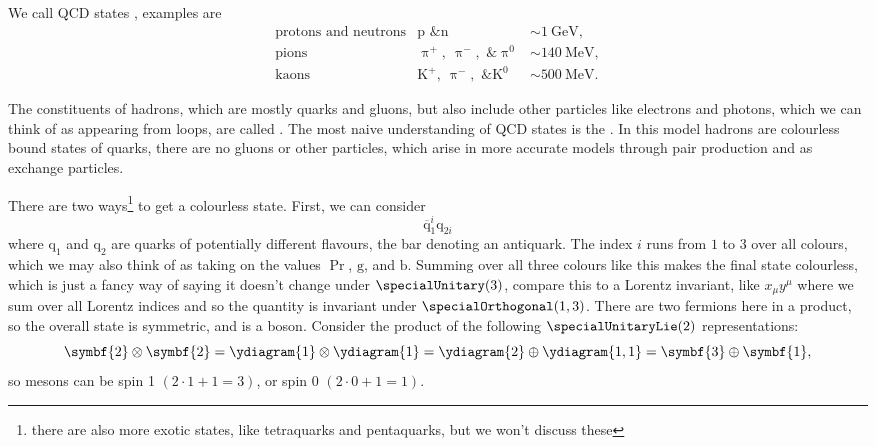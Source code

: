 \documentclass[fleqn]{NotesClass}
\newcommand{\Pparticle}[1]{\mathrm{#1}}
\newcommand{\Pb}{\ensuremath{\Pparticle{b}}}
\newcommand{\Pg}{\ensuremath{\Pparticle{g}}}
\newcommand{\Pq}{\ensuremath{\Pparticle{q}}}
\newcommand{\Ppip}{\ensuremath{\uppi^{+}}}
\newcommand{\Ppim}{\ensuremath{\uppi^{-}}}
\newcommand{\Ppizero}{\ensuremath{\uppi^{0}}}
\newcommand{\PKzero}{\ensuremath{\Pparticle{K}^0}}
\newcommand{\PKp}{\ensuremath{\Pparticle{K}^+}}
\newcommand{\Pp}{\ensuremath{\Pparticle{p}}}
\newcommand{\Pn}{\ensuremath{\Pparticle{n}}}
\newcommand{\diracadjoint}[1]{\overbar{#1}}
\newcommand{\rep}[1]{\symbf{#1}}
\begin{document}
    We call QCD states , examples are
    \begin{equation}
        \begin{array}{lll}
            \text{protons and neutrons} & \Pp \text{ \& } \Pn & \sim \qty{1}{\giga\electronvolt},\\
            \text{pions} & \Ppip, \ \Ppim, \text{ \& } \Ppizero & \sim \qty{140}{\mega\electronvolt},\\
            \text{kaons} & \PKp, \ \Ppim, \text{ \& } \PKzero & \sim \qty{500}{\mega\electronvolt}.
        \end{array}
    \end{equation}
    
    The constituents of hadrons, which are mostly quarks and gluons, but also include other particles like electrons and photons, which we can think of as appearing from loops, are called .
    The most naive understanding of QCD states is the .
    In this model hadrons are colourless bound states of quarks, there are no gluons or other particles, which arise in more accurate models through pair production and as exchange particles.
    
    There are two ways\footnote{there are also more exotic states, like tetraquarks and pentaquarks, but we won't discuss these} to get a colourless state.
    First, we can consider 
    \begin{equation}
        \diracadjoint{\Pq}_1^i \Pq_{2i}
    \end{equation}
    where \(\Pq_1\) and \(\Pq_2\) are quarks of potentially different flavours, the bar denoting an antiquark.
    The index \(i\) runs from \(1\) to \(3\) over all colours, which we may also think of as taking on the values \(\Pr\), \(\Pg\), and \(\Pb\).
    Summing over all three colours like this makes the final state colourless, which is just a fancy way of saying it doesn't change under \(\specialUnitary(3)\), compare this to a Lorentz invariant, like \(x_\mu y^\mu\) where we sum over all Lorentz indices and so the quantity is invariant under \(\specialOrthogonal(1, 3)\).
    There are two fermions here in a product, so the overall state is symmetric, and is a boson.
    Consider the product of the following \(\specialUnitaryLie(2)\) representations:
    \begin{equation}
        \rep{2} \otimes \rep{2} = \ydiagram{1} \otimes \ydiagram{1} = \ydiagram{2} \oplus \ydiagram{1,1} = \rep{3} \oplus \rep{1},
    \end{equation}
    so mesons can be spin 1 \((2 \cdot 1 + 1 = 3)\), or spin 0 \((2 \cdot 0 + 1 = 1)\).
    
\end{document}
